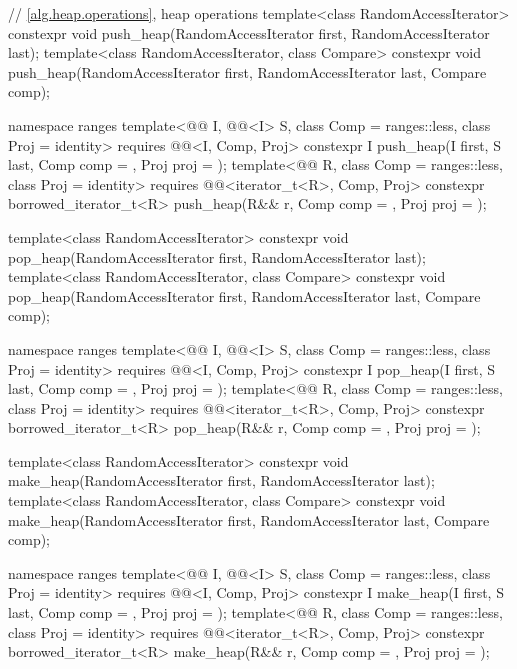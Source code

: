 \begin{codeblock}
{  // \ref{alg.heap.operations}, heap operations
  template<class RandomAccessIterator>
    constexpr void push_heap(RandomAccessIterator first, RandomAccessIterator last);
  template<class RandomAccessIterator, class Compare>
    constexpr void push_heap(RandomAccessIterator first, RandomAccessIterator last,
                             Compare comp);

  namespace ranges {
    template<@@ I, @@<I> S, class Comp = ranges::less,
             class Proj = identity>
      requires @@<I, Comp, Proj>
      constexpr I
        push_heap(I first, S last, Comp comp = {}, Proj proj = {});
    template<@@ R, class Comp = ranges::less, class Proj = identity>
      requires @@<iterator_t<R>, Comp, Proj>
      constexpr borrowed_iterator_t<R>
        push_heap(R&& r, Comp comp = {}, Proj proj = {});
  }

  template<class RandomAccessIterator>
    constexpr void pop_heap(RandomAccessIterator first, RandomAccessIterator last);
  template<class RandomAccessIterator, class Compare>
    constexpr void pop_heap(RandomAccessIterator first, RandomAccessIterator last,
                            Compare comp);

  namespace ranges {
    template<@@ I, @@<I> S, class Comp = ranges::less,
             class Proj = identity>
      requires @@<I, Comp, Proj>
      constexpr I
        pop_heap(I first, S last, Comp comp = {}, Proj proj = {});
    template<@@ R, class Comp = ranges::less, class Proj = identity>
      requires @@<iterator_t<R>, Comp, Proj>
      constexpr borrowed_iterator_t<R>
        pop_heap(R&& r, Comp comp = {}, Proj proj = {});
  }

  template<class RandomAccessIterator>
    constexpr void make_heap(RandomAccessIterator first, RandomAccessIterator last);
  template<class RandomAccessIterator, class Compare>
    constexpr void make_heap(RandomAccessIterator first, RandomAccessIterator last,
                             Compare comp);

  namespace ranges {
    template<@@ I, @@<I> S, class Comp = ranges::less,
             class Proj = identity>
      requires @@<I, Comp, Proj>
      constexpr I
        make_heap(I first, S last, Comp comp = {}, Proj proj = {});
    template<@@ R, class Comp = ranges::less, class Proj = identity>
      requires @@<iterator_t<R>, Comp, Proj>
      constexpr borrowed_iterator_t<R>
        make_heap(R&& r, Comp comp = {}, Proj proj = {});
  }

}
\end{codeblock}
